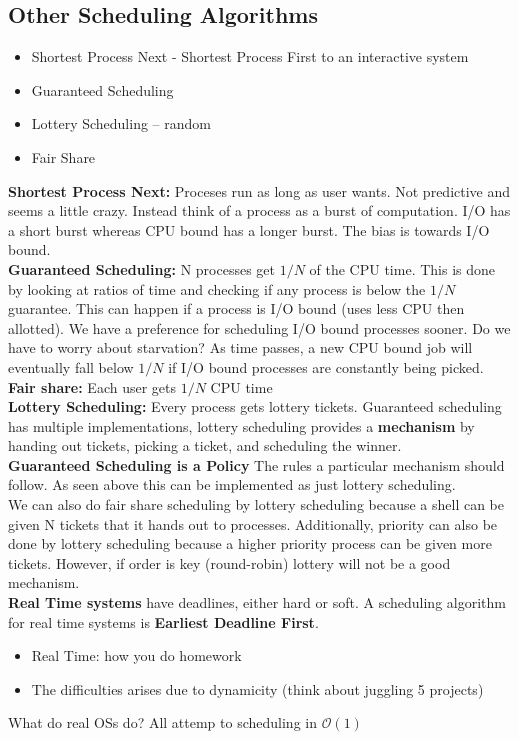 \documentclass[../base_file/cs1550_notes.tex]{subfiles}
\begin{document}
\subsection{Other Scheduling Algorithms}
\begin{itemize}
\item Shortest Process Next - Shortest Process First to an interactive system
\item Guaranteed Scheduling
\item Lottery Scheduling -- random
\item Fair Share
\end{itemize}

\textbf{Shortest Process Next:} Proceses run as long as user wants.  Not predictive and seems a little crazy. Instead
think of a process as a burst of computation.  I/O has a short burst whereas CPU bound has a longer burst.  The bias
is towards I/O bound.\\

\textbf{Guaranteed Scheduling:} N processes get $1/N$ of the CPU time.  This is done by looking at ratios of time and
checking if any process is below the $1/N$ guarantee.  This can happen if a process is I/O bound (uses less CPU then
allotted).  We have a preference for scheduling I/O bound processes sooner.  Do we have to worry about starvation?
As time passes, a new CPU bound job will eventually fall below $1/N$ if I/O bound processes are constantly being picked.\\

\textbf{Fair share:} Each user gets $1/N$ CPU time\\

\textbf{Lottery Scheduling:} Every process gets lottery tickets.  Guaranteed scheduling has multiple implementations,
lottery scheduling provides a \textbf{mechanism} by handing out tickets, picking a ticket, and scheduling the winner.\\

\textbf{Guaranteed Scheduling is a Policy} The rules a particular mechanism should follow.  As seen above this can be 
implemented as just lottery scheduling.\\

We can also do fair share scheduling by lottery scheduling because a shell can be given N tickets that it hands out 
to processes.  Additionally, priority can also be done by lottery scheduling because a higher priority process can
be given more tickets.  However, if order is key (round-robin) lottery will not be a good mechanism.\\

\textbf{Real Time systems} have deadlines, either hard or soft.  A scheduling algorithm for real time systems is
\textbf{Earliest Deadline First}.
\begin{itemize}
\item Real Time: how you do homework
\item The difficulties arises due to dynamicity (think about juggling 5 projects)
\end{itemize}

What do real OSs do? All attemp to scheduling in $\mathcal{O}(1)$
\end{document}
